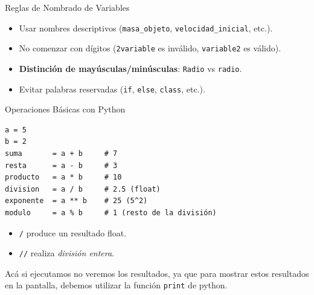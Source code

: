 \documentclass[10pt]{beamer}
\begin{document}
\begin{frame}{Reglas de Nombrado de Variables}
  \begin{itemize}
    \item Usar nombres descriptivos (\texttt{masa\_objeto}, \texttt{velocidad\_inicial}, etc.).
    \item No comenzar con dígitos (\texttt{2variable} es inválido, \texttt{variable2} es válido).
    \item \textbf{Distinción de mayúsculas/minúsculas}: \texttt{Radio} vs \texttt{radio}.
    \item Evitar palabras reservadas (\texttt{if}, \texttt{else}, \texttt{class}, etc.).
  \end{itemize}
\end{frame}

\begin{frame}[fragile]{Operaciones Básicas con Python}
\begin{verbatim}
a = 5
b = 2
suma       = a + b     # 7
resta      = a - b     # 3
producto   = a * b     # 10
division   = a / b     # 2.5 (float)
exponente  = a ** b    # 25 (5^2)
modulo     = a % b     # 1 (resto de la división)
\end{verbatim}
\begin{itemize}
  \item \texttt{/} produce un resultado float.
  \item \texttt{//} realiza \emph{división entera}.
\end{itemize}

Acá si ejecutamos no veremos los resultados, ya que para mostrar estos resultados en la pantalla, debemos utilizar la función \texttt{print} de python.
\end{frame}
\end{document}
